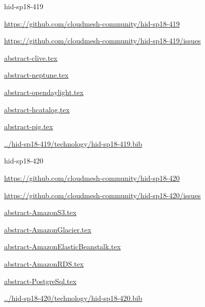 \begin{IU}

hid-sp18-419

\url{https://github.com/cloudmesh-community/hid-sp18-419}

\url{https://github.com/cloudmesh-community/hid-sp18-419/issues}

\href{https://github.com/cloudmesh-community/hid-sp18-419/blob/master//technology/abstract-clive.tex}{abstract-clive.tex}

\href{https://github.com/cloudmesh-community/hid-sp18-419/blob/master//technology/abstract-neptune.tex}{abstract-neptune.tex}

\href{https://github.com/cloudmesh-community/hid-sp18-419/blob/master//technology/abstract-opendaylight.tex}{abstract-opendaylight.tex}

\href{https://github.com/cloudmesh-community/hid-sp18-419/blob/master//technology/abstract-hcatalog.tex}{abstract-hcatalog.tex}

\href{https://github.com/cloudmesh-community/hid-sp18-419/blob/master//technology/abstract-pig.tex}{abstract-pig.tex}

\href{https://github.com/cloudmesh-community/hid-sp18-419/blob/master//technology/hid-sp18-419.bib}{../hid-sp18-419/technology/hid-sp18-419.bib}

\end{IU}


\begin{IU}

hid-sp18-420

\url{https://github.com/cloudmesh-community/hid-sp18-420}

\url{https://github.com/cloudmesh-community/hid-sp18-420/issues}

\href{https://github.com/cloudmesh-community/hid-sp18-420/blob/master//technology/abstract-AmazonS3.tex}{abstract-AmazonS3.tex}

\href{https://github.com/cloudmesh-community/hid-sp18-420/blob/master//technology/abstract-AmazonGlacier.tex}{abstract-AmazonGlacier.tex}

\href{https://github.com/cloudmesh-community/hid-sp18-420/blob/master//technology/abstract-AmazonElasticBeanstalk.tex}{abstract-AmazonElasticBeanstalk.tex}

\href{https://github.com/cloudmesh-community/hid-sp18-420/blob/master//technology/abstract-AmazonRDS.tex}{abstract-AmazonRDS.tex}

\href{https://github.com/cloudmesh-community/hid-sp18-420/blob/master//technology/abstract-PostgreSql.tex}{abstract-PostgreSql.tex}

\href{https://github.com/cloudmesh-community/hid-sp18-420/blob/master//technology/hid-sp18-420.bib}{../hid-sp18-420/technology/hid-sp18-420.bib}

\end{IU}


